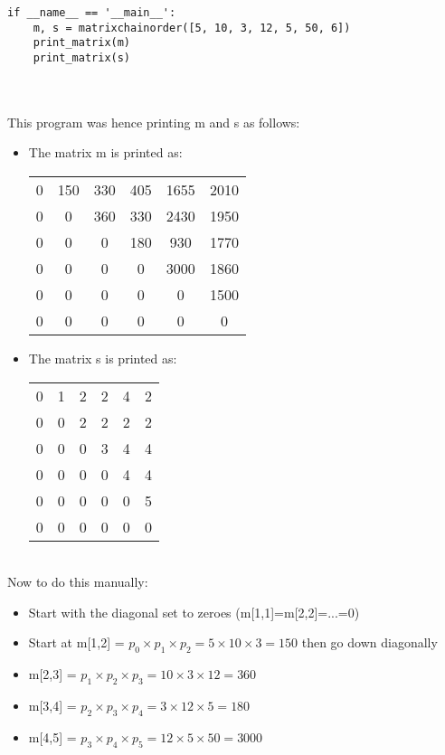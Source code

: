 \documentclass[11pt]{article}
\begin{document}
\begin{enumerate}
\begin{verbatim}
    


if __name__ == '__main__':
    m, s = matrixchainorder([5, 10, 3, 12, 5, 50, 6])
    print_matrix(m)
    print_matrix(s)
    \end{verbatim}
    \\\\ This program was hence printing m and s as follows:
    \begin{itemize}
        \item The matrix m is printed as:
        \begin{tabular}{ c c c c c c }
        0 & 150 & 330 & 405 & 1655 & 2010 \\
        0 & 0 & 360 & 330 & 2430 & 1950 \\
        0 & 0 & 0 & 180 & 930 & 1770 \\
        0 & 0 & 0 & 0 & 3000 & 1860 \\
        0 & 0 & 0 & 0 & 0 & 1500 \\
        0 & 0 & 0 & 0 & 0 & 0 \\
        \end{tabular}
        \item The matrix s is printed as:
        \begin{tabular}{ c c c c c c }
        0 & 1 & 2 & 2 & 4 & 2 \\
        0 & 0 & 2 & 2 & 2 & 2 \\
        0 & 0 & 0 & 3 & 4 & 4 \\
        0 & 0 & 0 & 0 & 4 & 4 \\
        0 & 0 & 0 & 0 & 0 & 5 \\
        0 & 0 & 0 & 0 & 0 & 0 \\
        \end{tabular}
    \end{itemize}
    \\ Now to do this manually:
    \begin{itemize}
        \item Start with the diagonal set to zeroes (m[1,1]=m[2,2]=...=0)
        \item Start at m[1,2] = $p_0 \times p_1 \times p_2 = 5 \times 10 \times 3 = 150$ then go down diagonally
        \item m[2,3] = $p_1 \times p_2 \times p_3 = 10 \times 3 \times 12 = 360$
        \item m[3,4] = $p_2 \times p_3 \times p_4 = 3 \times 12 \times 5 = 180$
        \item m[4,5] = $p_3 \times p_4 \times p_5 = 12 \times 5 \times 50 = 3000$

\end{itemize}
\end{enumerate}
\end{document}
